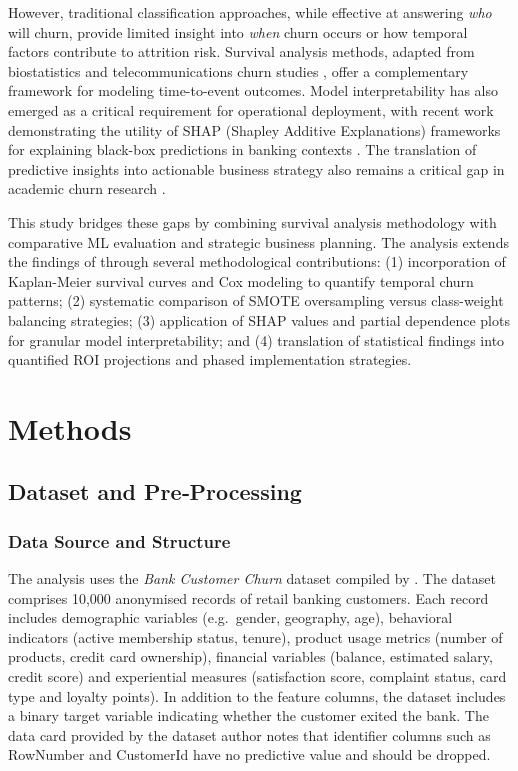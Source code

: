 \documentclass[12pt]{article}
\begin{document}
However, traditional classification approaches, while effective at answering \emph{who} will churn, provide limited insight into \emph{when} churn occurs or how temporal factors contribute to attrition risk. Survival analysis methods, adapted from biostatistics and telecommunications churn studies \citep{desai_customer_survival}, offer a complementary framework for modeling time-to-event outcomes. Model interpretability has also emerged as a critical requirement for operational deployment, with recent work demonstrating the utility of SHAP (Shapley Additive Explanations) frameworks for explaining black-box predictions in banking contexts \citep{peng2023interpretability}. The translation of predictive insights into actionable business strategy also remains a critical gap in academic churn research \citep{brito2024framework}.

This study bridges these gaps by combining survival analysis methodology with comparative ML evaluation and strategic business planning. The analysis extends the findings of \citet{singh2024productchurn} through several methodological contributions: (1) incorporation of Kaplan-Meier survival curves and Cox modeling to quantify temporal churn patterns; (2) systematic comparison of SMOTE oversampling versus class-weight balancing strategies; (3) application of SHAP values and partial dependence plots for granular model interpretability; and (4) translation of statistical findings into quantified ROI projections and phased implementation strategies.

\section{Methods}
\subsection{Dataset and Pre‑Processing}
\subsubsection{Data Source and Structure}
The analysis uses the \emph{Bank Customer Churn} dataset compiled by \citet{kollipara2022bank}.  The dataset comprises 10,000 anonymised records of retail banking customers.  Each record includes demographic variables (e.g.\ gender, geography, age), behavioral indicators (active membership status, tenure), product usage metrics (number of products, credit card ownership), financial variables (balance, estimated salary, credit score) and experiential measures (satisfaction score, complaint status, card type and loyalty points).  In addition to the feature columns, the dataset includes a binary target variable indicating whether the customer exited the bank.  The data card provided by the dataset author notes that identifier columns such as RowNumber and CustomerId have no predictive value and should be dropped.
\end{document}
